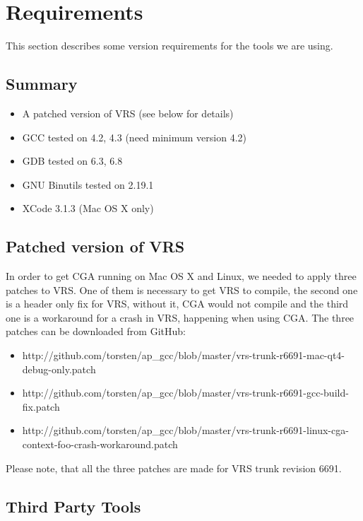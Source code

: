 
\section{Requirements} This section describes some version requirements for the tools we are using. 

\subsection{Summary}
\begin{itemize}
  \item A patched version of VRS (see below for details)
	\item GCC tested on 4.2, 4.3 (need minimum version 4.2)
	\item GDB tested on 6.3, 6.8
	\item GNU Binutils tested on 2.19.1
	\item XCode 3.1.3 (Mac OS X only)
\end{itemize}

\subsection{Patched version of VRS}

In order to get CGA running on Mac OS X and Linux, we needed to apply three patches to VRS. One of them is necessary to get VRS to compile, the second one is a header only fix for VRS, without it, CGA would not compile and the third one is a workaround for a crash in VRS, happening when using CGA. The three patches can be downloaded from GitHub:

\begin{itemize}
\item http://github.com/torsten/ap\_gcc/blob/master/vrs-trunk-r6691-mac-qt4-debug-only.patch
\item http://github.com/torsten/ap\_gcc/blob/master/vrs-trunk-r6691-gcc-build-f{}ix.patch
\item http://github.com/torsten/ap\_gcc/blob/master/vrs-trunk-r6691-linux-cga-context-foo-crash-workaround.patch
\end{itemize}

Please note, that all the three patches are made for VRS trunk revision 6691.

\subsection{Third Party Tools}

